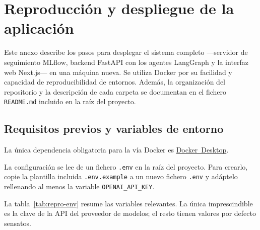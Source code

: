 \documentclass[12pt,a4paper]{article}
\makeatletter
\theoremstyle{plain}
\newcommand{\anexotocformat}{%
  \renewcommand*\l@section[2]{%
    \ifnum \c@tocdepth >\z@
      \addpenalty\@secpenalty
      \addvspace{1.0em \@plus\p@}%
      \setlength\@tempdima{5em}%
      \begingroup
        \parindent \z@ \rightskip \@pnumwidth
        \parfillskip -\@pnumwidth
        \leavevmode \bfseries
        \advance\leftskip\@tempdima
        \hskip -\leftskip
        ##1\nobreak\hfil \nobreak\hb@xt@\@pnumwidth{\hss ##2}\par
      \endgroup
    \fi}
}
\makeatother
\begin{document}
\addtocontents{toc}{\protect\anexotocformat}


\section{Reproducción y despliegue de la aplicación}
\label{anexo:reproduccion}

Este anexo describe los pasos para desplegar el sistema completo —servidor de seguimiento MLflow, backend FastAPI con los agentes LangGraph y la interfaz web Next.js— en una máquina nueva. Se utiliza Docker por su facilidad y capacidad de reproducibilidad de entornos. Además, la organización del repositorio y la descripción de cada carpeta se documentan en el fichero \texttt{README.md} incluido en la raíz del proyecto.

\subsection{Requisitos previos y variables de entorno}
\label{anexo:repro-requisitos}

La única dependencia obligatoria para la vía Docker es
\href{https://www.docker.com/products/docker-desktop/}{Docker~Desktop}.

La configuración se lee de un fichero \texttt{.env} en la raíz del proyecto. Para crearlo, copie la plantilla incluida \texttt{.env.example} a un nuevo fichero \texttt{.env} y adáptelo rellenando al menos la variable \texttt{OPENAI\_API\_KEY}.

La tabla~\ref{tab:repro-env} resume las variables relevantes. La única imprescindible
es la clave de la API del proveedor de modelos; el resto tienen valores por defecto
sensatos.
\end{document}
